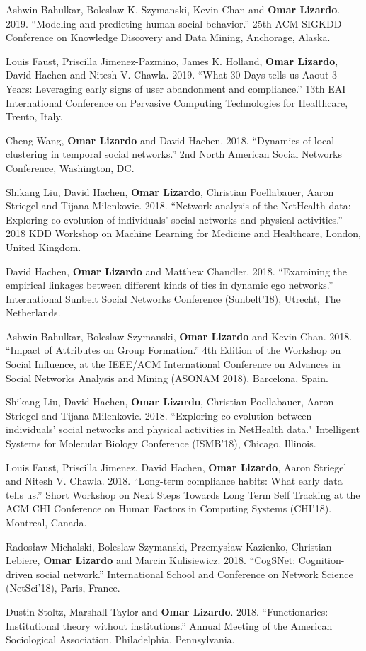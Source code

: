 \ind Ashwin Bahulkar, Boleslaw K. Szymanski, Kevin Chan and {\bf Omar Lizardo}. 2019. ``Modeling and predicting human social behavior.'' 25th ACM SIGKDD Conference on Knowledge Discovery and Data Mining, Anchorage, Alaska. 

\ind Louis Faust, Priscilla Jimenez-Pazmino, James K. Holland, {\bf Omar Lizardo}, David Hachen and Nitesh V. Chawla. 2019. ``What 30 Days tells us Aaout 3 Years: Leveraging early signs of user abandonment and compliance.'' 13th EAI International Conference on Pervasive Computing Technologies for Healthcare, Trento, Italy.

\ind Cheng Wang, {\bf Omar Lizardo} and David Hachen. 2018. ``Dynamics of local clustering in temporal social networks.'' 2nd North American Social Networks Conference, Washington, DC.

\ind Shikang Liu, David Hachen, {\bf Omar Lizardo}, Christian Poellabauer, Aaron Striegel and Tijana Milenkovic. 2018. ``Network analysis of the NetHealth data: Exploring co-evolution of individuals' social networks and physical activities.'' 2018 KDD Workshop on Machine Learning for Medicine and Healthcare, London, United Kingdom.

\ind David Hachen, {\bf Omar Lizardo} and Matthew Chandler. 2018. ``Examining the empirical linkages between different kinds of ties in dynamic ego networks.''  International Sunbelt Social Networks Conference (Sunbelt'18), Utrecht, The Netherlands.

\ind Ashwin Bahulkar, Boleslaw Szymanski, {\bf Omar Lizardo} and Kevin Chan. 2018. ``Impact of Attributes on Group Formation.'' 4th Edition of the Workshop on Social Influence, at the IEEE/ACM International Conference on Advances in Social Networks Analysis and Mining (ASONAM 2018), Barcelona, Spain.

\ind Shikang Liu, David Hachen, {\bf Omar Lizardo}, Christian Poellabauer, Aaron Striegel and Tijana Milenkovic. 2018. ``Exploring co-evolution between individuals' social networks and physical activities in NetHealth data." Intelligent Systems for Molecular Biology Conference (ISMB'18), Chicago, Illinois. 

\ind Louis Faust, Priscilla Jimenez, David Hachen, {\bf Omar Lizardo}, Aaron Striegel and Nitesh V. Chawla. 2018. ``Long-term compliance habits: What early data tells us.''  Short Workshop on Next Steps Towards Long Term Self Tracking at the ACM CHI Conference on Human Factors in Computing Systems (CHI'18). Montreal, Canada.

\ind Radosław Michalski, Boleslaw Szymanski, Przemysław Kazienko, Christian Lebiere, {\bf Omar Lizardo} and Marcin Kulisiewicz. 2018. ``CogSNet: Cognition-driven social network.'' International School and Conference on Network Science (NetSci'18), Paris, France.

\ind Dustin Stoltz, Marshall Taylor and {\bf Omar Lizardo}. 2018. ``Functionaries: Institutional theory without institutions.'' Annual Meeting of the American Sociological Association. Philadelphia, Pennsylvania. 